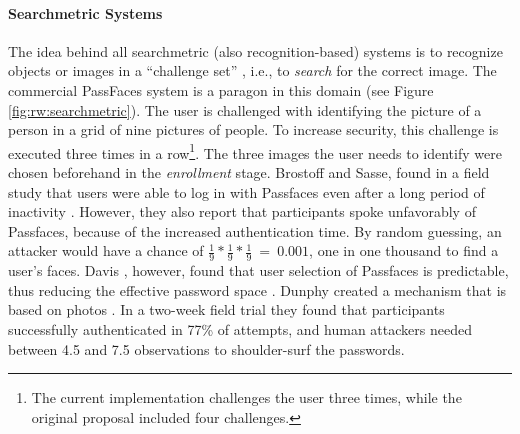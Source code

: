 	\paragraph{Searchmetric Systems}
	The idea behind all searchmetric (also recognition-based) systems is to recognize objects or images in a ``challenge set'' \cite{VonZezschwitz2016Thesis}, i.e., to \textit{search} for the correct image. The commercial PassFaces system is a paragon in this domain (see Figure \ref{fig:rw:searchmetric}). The user is challenged with identifying the picture of a person in a grid of nine pictures of people. To increase security, this challenge is executed three times in a row\footnote{The current implementation challenges the user three times, while the original proposal included four challenges.}. The three images the user needs to identify were chosen beforehand in the \textit{enrollment} stage. Brostoff and Sasse, found in a field study that users were able to log in with Passfaces even after a long period of inactivity \cite{Brostoff2000PassfacesEvaluation}. However, they also report that participants spoke unfavorably of Passfaces, because of the increased authentication time. By random guessing, an attacker would have a chance of $\frac{1}{9}*\frac{1}{9}*\frac{1}{9}~=~0.001$, \ie one in one thousand to find a user's faces. Davis \etal, however, found that user selection of Passfaces is predictable, thus reducing the effective password space \cite{Davis2004UserChoiceGraphical}. Dunphy \etal created a mechanism that is based on photos \cite{Dunphy2010CloserLookGraphical}. In a two-week field trial they found that participants successfully authenticated in 77\% of attempts, and human attackers needed between 4.5 and 7.5 observations to shoulder-surf the passwords. 
	
